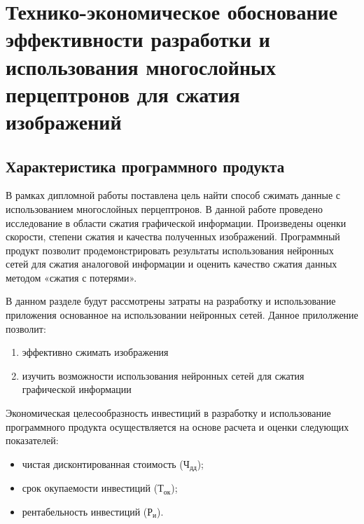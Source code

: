 \newcommand{\byr}{Br}

\section{Технико-экономическое обоснование эффективности разработки и использования многослойных перцептронов для сжатия изображений}

\subsection{Характеристика программного продукта}

В рамках дипломной работы поставлена цель найти способ сжимать данные с использованием многослойных перцептронов. В данной работе проведено исследование в области сжатия графической информации. Произведены оценки скорости, степени сжатия и качества полученных изображений. Программный продукт позволит продемонстрировать результаты использования нейронных сетей для сжатия аналоговой информации и оценить качество сжатия данных методом «сжатия с потерями».

В данном разделе будут рассмотрены затраты на разработку и использование приложения основанное на использовании нейронных сетей. Данное прилолжение позволит:
\begin{enumerate}

  \item эффективно сжимать изображения

  \item изучить возможности использования нейронных сетей для сжатия графической информации

\end{enumerate}

Экономическая целесообразность инвестиций в разработку и использование программного продукта осуществляется на основе расчета и оценки следующих показателей:

\begin{itemize}

  \item чистая  дисконтированная стоимость ($ \text{Ч}_\text{дд} $);
  
  \item срок окупаемости инвестиций ($ \text{Т}_\text{ок} $);
  
  \item рентабельность инвестиций ($ \text{Р}_\text{и} $).
  
\end{itemize}

